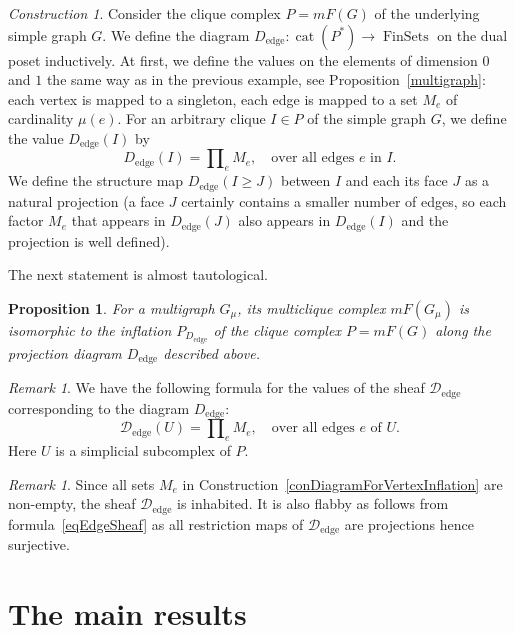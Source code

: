 \documentclass[english,12pt,oneside]{amsproc}
\DeclareMathOperator{\cat}{cat}
\DeclareMathOperator{\FinSets}{FinSets}
\DeclareMathOperator{\edge}{edge}
\newcommand{\ca}[1]{\mathcal{#1}}
\newcounter{stmcounter}[section]
\numberwithin{equation}{section}
\theoremstyle{plain}
\newtheorem{prop}[stmcounter]{Proposition}
\theoremstyle{definition}
\theoremstyle{remark}
\newtheorem{rem}[stmcounter]{Remark}
\newtheorem{con}[stmcounter]{Construction}
\begin{document}
\begin{con}
Consider the clique complex $P = mF(G)$ of the underlying simple graph $G$. We define the diagram $D_{\edge}\colon \cat(P^*)\to \FinSets$ on the dual poset inductively. At first, we define the values on the elements of dimension $0$ and $1$ the same way as in the previous example, see Proposition~\ref{multigraph}: each vertex is mapped to a singleton, each edge is mapped to a set $M_e$ of cardinality $\mu(e)$. For an arbitrary clique $I\in P$ of the simple graph $G$, we define the value $D_{\edge}(I)$ by
\begin{equation}
    D_{\edge}(I) = \prod\nolimits_{e}M_e,\quad \text{over all edges $e$ in $I$}.
\end{equation}
We define the structure map $D_{\edge}(I\geq J)$ between $I$ and each its face $J$ as a natural projection (a face $J$ certainly contains a smaller number of edges, so each factor $M_e$ that appears in $D_{\edge}(J)$ also appears in $D_{\edge}(I)$ and the projection is well defined).
\end{con}
The next statement is almost tautological.

\begin{prop}\label{multiclique2}
    For a multigraph $G_\mu$, its multiclique complex $mF(G_\mu)$ is isomorphic to the inflation $P_{D_{\edge}}$ of the clique complex $P=mF(G)$ along the projection diagram $D_{\edge}$ described above.
\end{prop}

\begin{rem}
We have the following formula for the values of the sheaf $\ca{D}_{\edge}$ corresponding to the diagram $D_{\edge}$:
\begin{equation}\label{eqEdgeSheaf}
\ca{D}_{\edge}(U)=\prod\nolimits_{e}M_e,\quad \text{over all edges $e$ of $U$}.
\end{equation}
Here $U$ is a simplicial subcomplex of $P$.
\end{rem}

\begin{rem}\label{remEdgeInflationFlabby}
Since all sets $M_e$ in Construction~\ref{conDiagramForVertexInflation} are non-empty, the sheaf $\ca{D}_{\edge}$ is inhabited. It is also flabby as follows from formula~\eqref{eqEdgeSheaf} as all restriction maps of $\ca{D}_{\edge}$ are projections hence surjective.
\end{rem}


\section{The main results}\label{secFormulations}
\end{document}
